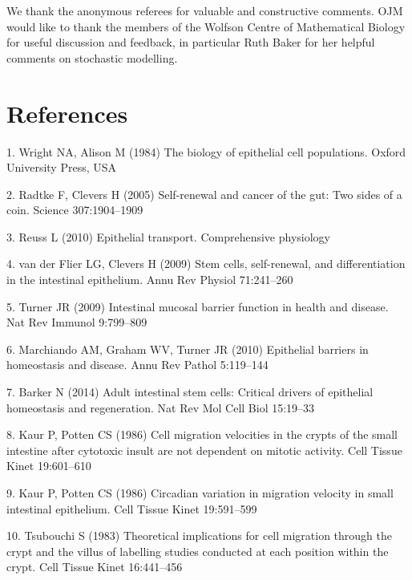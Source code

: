 \documentclass[10pt,letterpaper]{article}
\begin{document}
We thank the anonymous referees for valuable and constructive comments. OJM would like to thank the members of the Wolfson Centre of Mathematical Biology for useful discussion and feedback, in particular Ruth Baker for her helpful comments on stochastic modelling.

\nolinenumbers

\section*{References}\label{references}

\hypertarget{refs}{}
\hypertarget{ref-Wright1984-kw}{}
1. Wright NA, Alison M (1984) The biology of epithelial cell
populations. Oxford University Press, USA

\hypertarget{ref-Radtke2005-dh}{}
2. Radtke F, Clevers H (2005) Self-renewal and cancer of the gut: Two
sides of a coin. Science 307:1904--1909

\hypertarget{ref-Reuss2010-fn}{}
3. Reuss L (2010) Epithelial transport. Comprehensive physiology

\hypertarget{ref-Van_der_Flier2009-hw}{}
4. van der Flier LG, Clevers H (2009) Stem cells, self-renewal, and
differentiation in the intestinal epithelium. Annu Rev Physiol
71:241--260

\hypertarget{ref-Turner2009-ei}{}
5. Turner JR (2009) Intestinal mucosal barrier function in health and
disease. Nat Rev Immunol 9:799--809

\hypertarget{ref-Marchiando2010-th}{}
6. Marchiando AM, Graham WV, Turner JR (2010) Epithelial barriers in
homeostasis and disease. Annu Rev Pathol 5:119--144

\hypertarget{ref-Barker2014-xu}{}
7. Barker N (2014) Adult intestinal stem cells: Critical drivers of
epithelial homeostasis and regeneration. Nat Rev Mol Cell Biol 15:19--33

\hypertarget{ref-Kaur1986-xq}{}
8. Kaur P, Potten CS (1986) Cell migration velocities in the crypts of
the small intestine after cytotoxic insult are not dependent on mitotic
activity. Cell Tissue Kinet 19:601--610

\hypertarget{ref-Kaur1986-je}{}
9. Kaur P, Potten CS (1986) Circadian variation in migration velocity in
small intestinal epithelium. Cell Tissue Kinet 19:591--599

\hypertarget{ref-Tsubouchi1983-tk}{}
10. Tsubouchi S (1983) Theoretical implications for cell migration
through the crypt and the villus of labelling studies conducted at each
position within the crypt. Cell Tissue Kinet 16:441--456
\end{document}
